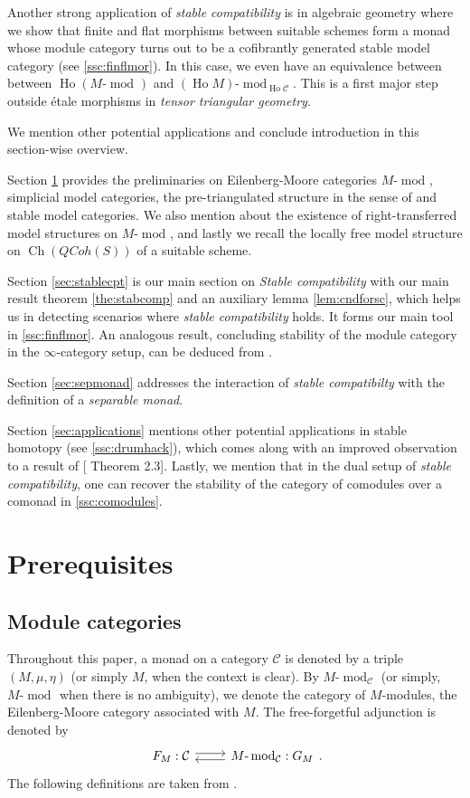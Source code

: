 \documentclass{article}
\newcommand{\cC}{\mathcal{C}}
\newcommand{\adjunction}[4]{\begin{tikzcd}[ampersand replacement=\&] #1 : #2 \arrow[r, shift left] \& #3 : #4 \arrow[l, shift left] \end{tikzcd}}
\newcommand{\module}[2][]{#2\text{-}\modop_{#1}}
\DeclareMathOperator{\Ch}{Ch}
\DeclareMathOperator{\Ho}{Ho}
\DeclareMathOperator{\modop}{mod}
\theoremstyle{definition}
\theoremstyle{remark}
\begin{document}
Another strong application of \textit{stable compatibility} is in algebraic geometry where we show that finite and flat morphisms between suitable schemes form a monad whose module category turns out to be a cofibrantly generated stable model category (see \textsection \ref{ssc:finflmor}). In this case, we even have an equivalence between between $\Ho(\module{M})$ and $\module[\Ho \cC]{(\Ho M)}$. This is a first major step outside \'etale morphisms in \textit{tensor triangular geometry}.


We mention other potential applications and conclude introduction in this section-wise overview. 

Section \ref{sec:prereqst} provides the preliminaries on Eilenberg-Moore categories $\module{M}$, simplicial model categories, the pre-triangulated structure in the sense of \cite{MR1650134} and stable model categories. We also mention about the existence of right-transferred model structures on $\module{M}$, and lastly we recall the locally free model structure on $\Ch(QCoh(S))$ of a suitable scheme. 

Section \ref{sec:stablecpt} is our main section on \textit{Stable compatibility} with our main result theorem \ref{the:stabcomp} and an auxiliary lemma \ref{lem:cndforsc}, which helps us in detecting scenarios where \textit{stable compatibility} holds. It forms our main tool in \textsection \ref{ssc:finflmor}. An analogous result, concluding stability of the module category in the $\infty$-category setup, can be deduced from \cite[corollary 5.5 and theorem 5.7]{MR3338539}. 

Section \ref{sec:sepmonad} addresses the interaction of \textit{stable compatibilty} with the definition of a \textit{separable monad}.

Section \ref{sec:applications} mentions other potential applications in stable homotopy (see \textsection \ref{ssc:drumhack}), which comes along with an improved observation to a result of [\cite{MR3937590} Theorem 2.3]. Lastly, we mention that in the dual setup of \textit{stable compatibility}, one can recover the stability of the category of comodules over a comonad in \textsection \ref{ssc:comodules}.



\section{Prerequisites} \label{sec:prereqst}

\subsection{Module categories} \label{ssc:monads}
Throughout this paper, a monad on a category $\cC$ is denoted by a triple $(M,\mu,\eta)$ (or simply $M$, when the context is clear). By $\module[\cC]{M}$ (or simply, $\module{M}$ when there is no ambiguity), we denote the category of $M$-modules, the Eilenberg-Moore category \cite{maclane:catworkmath} associated with $M$. The free-forgetful adjunction is denoted by 
\[
\adjunction{F_M}{\cC}{\module[\cC]{M}}{G_M}.
\]
The following definitions are taken from  \cite{balmer:septrcat}.
\end{document}
